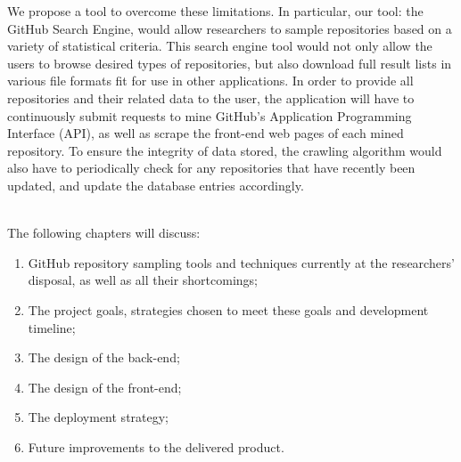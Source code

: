 \newpage

We propose a tool to overcome these limitations.
In particular, our tool: the GitHub Search Engine, would allow researchers to sample repositories based on a variety of statistical criteria.
This search engine tool would not only allow the users to browse desired types of repositories, but also download full result lists in various file formats fit for use in other applications.
In order to provide all repositories and their related data to the user, the application will have to continuously submit requests to mine GitHub's Application Programming Interface (API), as well as scrape the front-end web pages of each mined repository.
To ensure the integrity of data stored, the crawling algorithm would also have to periodically check for any repositories that have recently been updated, and update the database entries accordingly.

\mbox{}\\
The following chapters will discuss:
\begin{enumerate}
    \item GitHub repository sampling tools and techniques currently at the researchers' disposal, as well as all their shortcomings;
    \item The project goals, strategies chosen to meet these goals and development timeline;
    \item The design of the back-end;
    \item The design of the front-end;
    \item The deployment strategy;
    \item Future improvements to the delivered product.
\end{enumerate}
